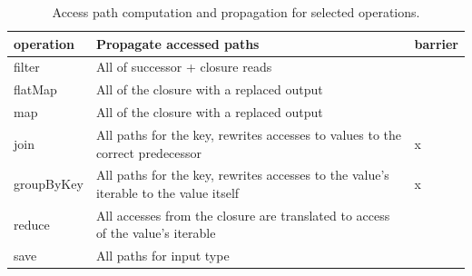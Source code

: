  \begin{table}[width=0.5\pagewidth]

    \begin{tabularx}{0.5\textwidth}{l|X|l}
        operation    & Propagate accessed paths 							     & barrier \\ \hline
        filter       & All of successor + closure reads                                                      & ~       \\ 
        flatMap      & All of the closure with a replaced output                                             & ~       \\ 
        map          & All of the closure with a replaced output                                             & ~       \\ 
        join         & All paths for the key, rewrites accesses to values to the correct predecessor         & x       \\ 
        groupByKey   & All paths for the key, rewrites accesses to the value's iterable to the value itself  & x       \\ 
        reduce       & All accesses from the closure are translated to access of the value's iterable        & ~       \\ 
        save         & All paths for input type           	                                             & ~       \\ 
    \end{tabularx}
    
    \caption{Access path computation and propagation for selected operations.}
\label{table:field_reduction}
 \end{table}

